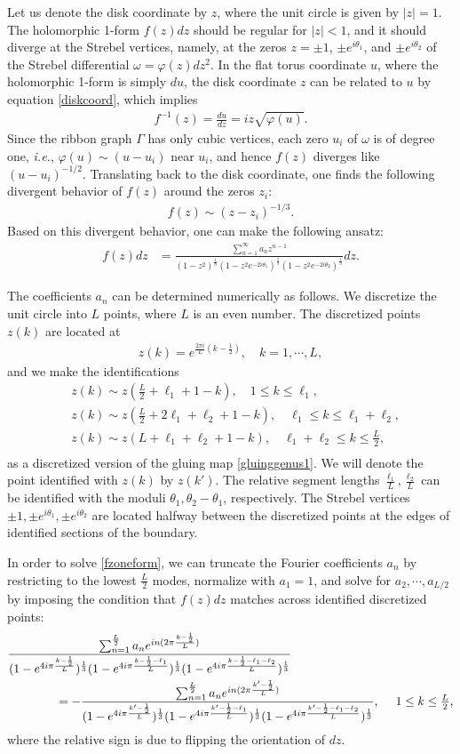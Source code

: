 \documentclass[12pt]{article}
\def\ie{\begin{equation}\begin{aligned}}
\def\fe{\end{aligned}\end{equation}}
\numberwithin{equation}{section}
\begin{document}
Let us denote the disk coordinate by $z$, where the unit circle is given by $|z|=1$. The holomorphic 1-form $f(z)dz$ should be regular for $|z|<1$, and it should diverge at the Strebel vertices, namely, at the zeros $z=\pm 1$, $\pm e^{i\theta_1}$, and $\pm e^{i\theta_2}$ of the Strebel differential $\omega = \varphi(z)dz^2$. In the flat torus coordinate $u$, where the holomorphic 1-form is simply $du$, the disk coordinate $z$ can be related to $u$ by equation \eqref{diskcoord}, which implies
\ie
f^{-1}(z) = \frac{du}{dz} = iz\sqrt{\varphi(u)}.
\fe
Since the ribbon graph $\Gamma$ has only cubic vertices, each zero $u_i$ of $\omega$ is of degree one, \textit{i.e.}, $\varphi(u)\sim (u-u_i)$ near $u_i$, and hence $f(z)$ diverges like $(u-u_i)^{-1/2}$. Translating back to the disk coordinate, one finds the following divergent behavior of $f(z)$ around the zeros $z_i$:
\ie
f(z) \sim (z-z_i)^{-1/3}.
\fe
Based on this divergent behavior, one can make the following ansatz:
\ie\label{fzoneform}
f(z) dz &= \frac{\sum_{n=1}^\infty a_n z^{n-1}}{(1-z^2)^{\frac13} (1-z^2 e^{-2 i \theta_1})^{\frac13} (1-z^2 e^{-2i \theta_2})^{\frac13}} dz.
\fe

The coefficients $a_n$ can be determined numerically as follows. We discretize the unit circle into $L$ points, where $L$ is an even number. The discretized points $z(k)$ are located at
\ie\label{zkposition}
z(k) = e^{\frac{2\pi i}{L}(k-\frac{1}{2})},\quad k=1,\cdots, L,
\fe
and we make the identifications
\ie
&z(k) \sim z(\tfrac{L}{2}+\ell_1+1-k),\quad 1\leq k \leq \ell_1,\\
&z(k) \sim z(\tfrac{L}{2}+2\ell_1+\ell_2+1-k),\quad \ell_1 \leq k \leq \ell_1+\ell_2,\\
&z(k) \sim z(L+\ell_1+\ell_2+1-k),\quad \ell_1+\ell_2\leq k \leq \tfrac{L}{2},\\
\fe
as a discretized version of the gluing map \eqref{gluinggenus1}. We will denote the point identified with $z(k)$ by $z(k')$. The relative segment lengths $\tfrac{\ell_1}{L}, \tfrac{\ell_2}{L}$ can be identified with the moduli $\theta_1, \theta_2-\theta_1$, respectively. The Strebel vertices $\pm 1,\pm e^{i\theta_1}, \pm e^{i\theta_2}$ are located halfway between the discretized points at the edges of identified sections of the boundary.

In order to solve \eqref{fzoneform}, we can truncate the Fourier coefficients $a_n$ by restricting to the lowest $\tfrac{L}{2}$ modes, normalize with $a_1=1$, and solve for $a_2,\cdots, a_{L/2}$ by imposing the condition that $f(z)dz$ matches across identified discretized points:
\ie
{}&\frac{\sum_{n=1}^{L \over 2} a_n e^{in (2 \pi \frac{k-\frac 12}{L})} }{(1-e^{4i\pi \frac{k-\frac12}{L}})^{\frac13} (1- e^{4i \pi \frac{k-\frac12-\ell_1}{L} })^{\frac13} (1- e^{4i\pi \frac{k-\frac12-\ell_1 -\ell_2}{L} })^{\frac13}}\\
&\qquad\qquad = - \frac{\sum_{n=1}^{L \over 2} a_n e^{in (2 \pi \frac{k'-\frac 12}{L})} }{(1-e^{4i\pi \frac{k'-\frac12}{L}})^{\frac13} (1- e^{4i \pi \frac{k'-\frac12-\ell_1}{L} })^{\frac13} (1- e^{4i\pi \frac{k'-\frac12-\ell_1 -\ell_2}{L} })^{\frac13}}, ~~~~1 \leq k \leq \tfrac{L}{2},
\fe
where the relative sign is due to flipping the orientation of $dz$. 
\end{document}
